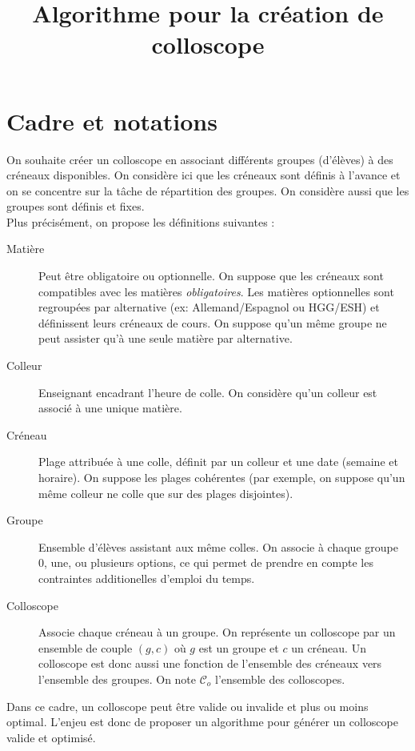\documentclass{article}
\title{Algorithme pour la création de colloscope}
\begin{document}
\maketitle

\section{Cadre et notations}

On souhaite créer un colloscope en associant différents groupes
(d'élèves) à des créneaux disponibles. On considère ici que les créneaux
sont définis à l'avance et on se concentre sur la tâche de répartition des groupes.
On considère aussi que les groupes sont définis et fixes. \\

Plus précisément, on propose les définitions suivantes :
\begin{description}
    \item[Matière] Peut être obligatoire ou optionnelle. On suppose que les créneaux sont compatibles avec les
        matières \emph{obligatoires}. Les matières optionnelles sont regroupées par alternative (ex: Allemand/Espagnol ou HGG/ESH) et
        définissent leurs créneaux de cours. On suppose qu'un même groupe ne peut assister qu'à une seule matière par alternative.
    \item[Colleur] Enseignant encadrant l'heure de colle. On considère qu'un colleur est associé à une unique matière.
    \item[Créneau] Plage attribuée à une colle, définit par un colleur et une date (semaine et horaire). On suppose les plages cohérentes (par exemple, on
        suppose qu'un même colleur ne colle que sur des plages disjointes).

    \item[Groupe] Ensemble d'élèves assistant aux même colles. On associe à chaque groupe 0, une, ou plusieurs options, ce qui permet de
        prendre en compte les contraintes additionelles d'emploi du temps.
    \item[Colloscope] Associe chaque créneau à un groupe. On représente un colloscope par un ensemble de couple $(g, c)$ où $g$ est un groupe
        et $c$ un créneau. Un colloscope est donc aussi une fonction de l'ensemble des créneaux vers l'ensemble des groupes. On note $\mathcal{C}_o$ l'ensemble des colloscopes.
\end{description}

Dans ce cadre, un colloscope peut être valide ou invalide et plus ou moins optimal. L'enjeu est
donc de proposer un algorithme pour générer un colloscope valide et optimisé.
\end{document}

